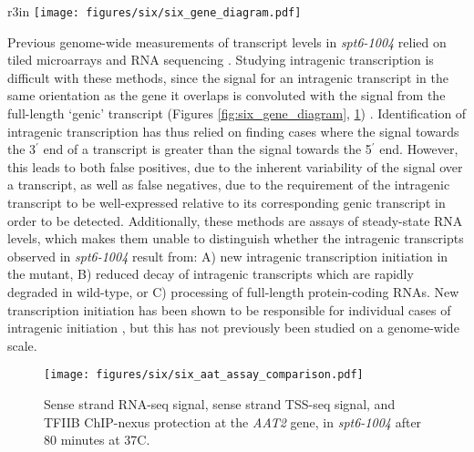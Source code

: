 \begin{wrapfigure}[7]{r}{3in}
    \centering
    \texttt{[image: figures/six/six\_gene\_diagram.pdf]}
    \caption[Diagram of transcript classes.]{Diagram of transcript orientation with respect to coding DNA sequences, for the categories of transcripts referred to in this document.}
    \label{fig:six_gene_diagram}
\end{wrapfigure}
Previous genome-wide measurements of transcript levels in \textit{spt6-1004} relied on tiled microarrays \citep{cheung2008} and RNA sequencing \citep{degennaro2013, uwimana2017}.
Studying intragenic transcription is difficult with these methods, since the signal for an intragenic transcript in the same orientation as the gene it overlaps is convoluted with the signal from the full-length `genic' transcript (Figures \ref{fig:six_gene_diagram}, \ref{fig:six_aat_assay_comparison}) \citep{cheung2008, lickwar2009}.
Identification of intragenic transcription has thus relied on finding cases where the signal towards the 3$^\prime$ end of a transcript is greater than the signal towards the 5$^\prime$ end.
However, this leads to both false positives, due to the inherent variability of the signal over a transcript, as well as false negatives, due to the requirement of the intragenic transcript to be well-expressed relative to its corresponding genic transcript in order to be detected.
Additionally, these methods are assays of steady-state RNA levels, which makes them unable to distinguish whether the intragenic transcripts observed in \textit{spt6-1004} result from: A) new intragenic transcription initiation in the mutant, B) reduced decay of intragenic transcripts which are rapidly degraded in wild-type, or C) processing of full-length protein-coding RNAs.
New transcription initiation has been shown to be responsible for individual cases of intragenic initiation \citep{kaplan2003}, but this has not previously been studied on a genome-wide scale.
\begin{figure}[h]
    \centering
    \texttt{[image: figures/six/six\_aat\_assay\_comparison.pdf]}
    \caption[RNA-seq, TSS-seq, and TFIIB ChIP-nexus signal at the \textit{AAT2} gene, in \textit{spt6-1004} after 80 minutes at 37\textdegree C.]{Sense strand RNA-seq signal, sense strand TSS-seq signal, and TFIIB ChIP-nexus protection at the \textit{AAT2} gene, in \textit{spt6-1004} after 80 minutes at 37\textdegree C.}
    \label{fig:six_aat_assay_comparison}
\end{figure}

